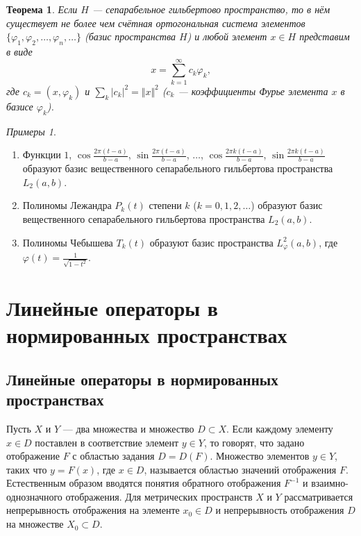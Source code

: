 \documentclass[12pt,a4paper,titlepage,oneside]{book}
\theoremstyle{definition}
\theoremstyle{plain}
\newtheorem*{theorem}{Теорема}
\theoremstyle{break}
\theoremstyle{remark}
\theoremstyle{remark}
\theoremstyle{remark}
\newtheorem*{examples}{Примеры}
\theoremstyle{remark}
\theoremstyle{plain}
\theoremstyle{plain}
\begin{document}
\begin{theorem}
Если $H$ --- сепарабельное гильбертово пространство, то в нём существует не более чем счётная ортогональная система элементов $\lbrace \varphi_1, \varphi_2, \ldots, \varphi_n, \ldots \rbrace$ (базис пространства $H$) и любой элемент $x \in H$ представим в виде 
$$x = \displaystyle\sum_{k=1}^{\infty} c_k \varphi_k,$$
где $c_k = (x, \varphi_k)$ и $\displaystyle\sum_{k} \lvert c_k \rvert^2 = \Vert x \Vert^2$ ($c_k$ --- коэффициенты Фурье элемента $x$ в базисе $\varphi_k$).
\end{theorem}

\begin{examples}
\leavevmode
\begin{enumerate}
	\item Функции $1$, $\cos \frac{2 \pi (t - a)}{b - a}$, $\sin \frac{2 \pi (t - a)}{b - a}$, $\ldots$, $\cos \frac{2 \pi k (t - a)}{b - a}$, $\sin \frac{2 \pi k (t - a)}{b - a}$ образуют базис вещественного сепарабельного гильбертова пространства $L_2(a, b)$.
	
	\item Полиномы Лежандра $P_k(t)$ степени $k$ ($k = 0, 1, 2, \ldots$) образуют базис вещественного сепарабельного гильбертова пространства $L_2(a, b)$.
	
	\item Полиномы Чебышева $T_k(t)$ образуют базис пространства $L_{\varphi}^2 (a, b)$, где $\varphi(t) = \frac{1}{\sqrt{1 - t^2}}$.
\end{enumerate}
\end{examples}

\chapter{Линейные операторы в нормированных пространствах}

\section{Линейные операторы в нормированных пространствах}
Пусть $X$ и $Y$ --- два множества и множество $D \subset X$. Если каждому элементу $x \in D$ поставлен в соответствие элемент $y \in Y$, то говорят, что задано отображение $F$ с областью задания $D=D(F)$. Множество элементов $y \in Y$, таких что $y=F(x)$, где $x \in D$, называется областью значений отображения $F$. Естественным образом вводятся понятия обратного отображения ${F}^{-1}$ и взаимно-однозначного отображения. Для метрических пространств $X$ и $Y$ рассматривается непрерывность отображения на элементе $x_0 \in D$ и непрерывность отображения $D$ на множестве $X_0 \subset D$.
\end{document}
